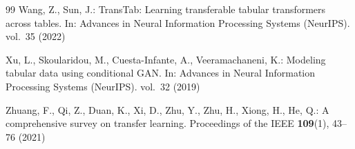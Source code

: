 \documentclass[runningheads]{llncs}
\begin{document}
\begin{thebibliography}{99}
Wang, Z., Sun, J.: TransTab: Learning transferable tabular transformers across tables. In: Advances in Neural Information Processing Systems (NeurIPS). vol.~35 (2022)

Xu, L., Skoularidou, M., Cuesta-Infante, A., Veeramachaneni, K.: Modeling tabular data using conditional GAN. In: Advances in Neural Information Processing Systems (NeurIPS). vol.~32 (2019)

Zhuang, F., Qi, Z., Duan, K., Xi, D., Zhu, Y., Zhu, H., Xiong, H., He, Q.: A comprehensive survey on transfer learning. Proceedings of the IEEE \textbf{109}(1), 43--76 (2021)

\end{thebibliography}
\end{document}
